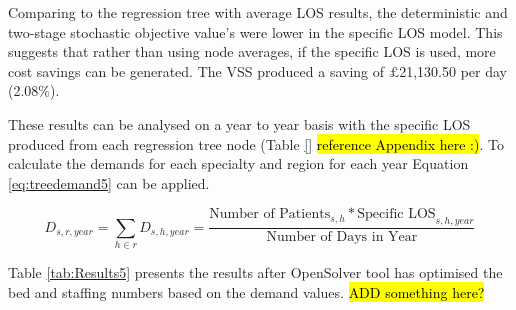 \documentclass[../thesis.tex]{subfiles}
\begin{document}
Comparing to the regression tree with average LOS results, the deterministic and two-stage stochastic objective value's were lower in the specific LOS model. This suggests that rather than using node averages, if the specific LOS is used, more cost savings can be generated. The VSS produced a saving of $\pounds$21,130.50 per day (2.08\%). 

These results can be analysed on a year to year basis with the specific LOS produced from each regression tree node (Table \ref{} \hl{reference Appendix here :)}. To calculate the demands for each specialty and region for each year Equation \eqref{eq:treedemand5} can be applied.


\begin{equation}\label{eq:treedemand5}
        D_{s,r,year} = \sum\limits_{h \in r} D_{s,h,year} = \frac{\text{Number of Patients}_{s,h}*{\text{Specific LOS}_{s,h,year}}}{{\text{Number of Days in Year}}}
\end{equation}

Table \ref{tab:Results5} presents the results after OpenSolver tool has optimised the bed and staffing numbers based on the demand values. \hl{ADD something here?} 
\end{document}
